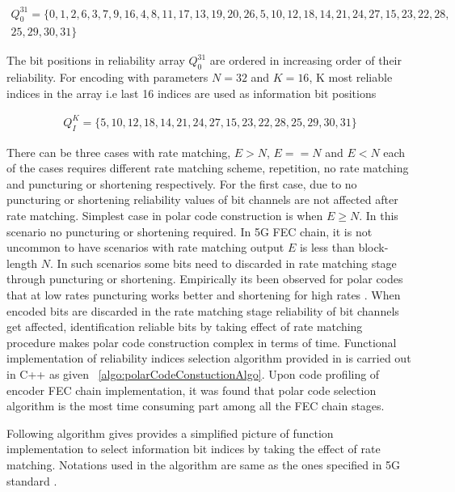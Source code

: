 \begin{eqnarray*}
Q_{0}^{31} = \{ 0, 1, 2, 6, 3, 7, 9, 16,4, 8, 11, 17, 13, 19, 20, 26, 5, 10, 12, 18, 14, 21, 24, 27, 15, 23, 22, 28,\\
25, 29, 30, 31 \}
\end{eqnarray*}

The bit positions in reliability array $Q_{0}^{31}$ are ordered in increasing order of their reliability. For encoding with parameters $N = 32$ and $K = 16$, K most reliable indices in the array i.e last 16 indices are used as information bit positions 

\begin{eqnarray*}
	Q_{\textit{I}}^{\textit{K}} =  \{5, 10, 12, 18, 14, 21, 24, 27, 15, 23, 22, 28,25, 29, 30, 31 \}
\end{eqnarray*} 

There can be three cases with rate matching, $E > N$, $E == N$ and $E < N$ each of the cases requires different rate matching scheme, repetition, no rate matching and puncturing or shortening respectively. For the first case, due to no puncturing or shortening reliability values of bit channels are not affected after rate matching. Simplest case in polar code construction is when $E \geq N$. In this scenario no puncturing or shortening required.  In 5G FEC chain, it is not uncommon to have scenarios with rate matching output $E$ is less than block-length $N$. In such scenarios some bits need to discarded in rate matching stage through puncturing or shortening. Empirically its been observed for polar codes that at low rates puncturing works better and shortening for high rates \cite{lowcomplexityPuncShorteng}. When encoded bits are discarded in the rate matching stage reliability of bit channels get affected, identification reliable bits by taking effect of rate matching procedure makes polar code construction complex in terms of time. Functional implementation of reliability indices selection algorithm provided in \cite{3gpp.38.212} is carried out in C++ as given  ~\ref{algo:polarCodeConstuctionAlgo}. Upon code profiling of encoder FEC chain implementation, it was found that polar code selection algorithm is the most time consuming part among all the FEC chain stages. \newline

Following algorithm gives provides a simplified picture of function implementation to select information bit indices by taking the effect of rate matching. 
Notations used in the algorithm are same as the ones specified in 5G standard \cite{3gpp.38.212}.

